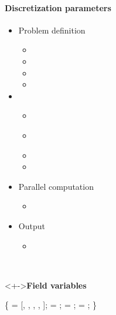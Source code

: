 
\begin{frame}[fragile] 
\secframetitle{\ssParameters}
\framesubtitle{Discretization parameters}
\vspace{-0.2in}
\begin{minipage}[t]{1.7in}
\begin{itemize}
\item Problem definition
  \begin{itemize}
  \item {}
  \item {}
  \item {}
  \item {}
  \end{itemize}
\item {}
  \begin{itemize}
  \item \textcolor{green!50!black}{}
  \item \textcolor{green!50!black}{}
  \item {}
  \item {}
  \end{itemize}
\item Parallel computation
  \begin{itemize}
  \item {}
  \end{itemize}
\item Output
  \begin{itemize}
    \item {}
  \end{itemize}
\end{itemize}
\end{minipage} \
\begin{minipage}[t]{2.6in}
\vspace{-0.2in}
  \begin{block}<+->{\textbf{Field variables}}
  \footnotesize \vspace{-0.1in}
\begin{semiverbatim}
 \{
    = [,
           ,
           ,
           ,
           ];
      = ;
       = ;
    = ;    
\}
\end{semiverbatim}
\end{block}
\end{minipage}
\end{frame}
  

